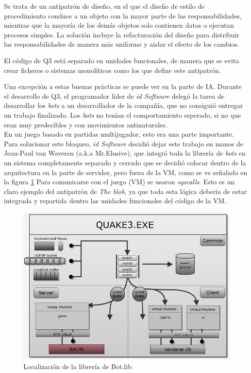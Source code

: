 \documentclass[a4paper,12pt]{report}
\begin{document}
Se trata de un antipatrón de diseño, en el que el diseño de estilo de procedimiento conduce a un objeto con la mayor parte de las responsabilidades, mientras que la mayoría de los demás objetos solo contienen datos o ejecutan procesos simples. La solución incluye la refacturación del diseño para distribuir las responsabilidades de manera más uniforme y aislar el efecto de los cambios.

El código de Q3 está separado en unidades funcionales, de manera que se evita crear ficheros o sistemas monolíticos como los que define este antipatrón.

Una excepción a estas buenas prácticas se puede ver en la parte de IA. Durante el desarrollo de Q3, el programador líder de \textit{id Software} delegó la tarea de desarrollar los \textit{bots} a un desarrollador de la compañía, que no consiguió entregar un trabajo finalizado. Los \textit{bots} no tenían el comportamiento esperado, si no que eran muy predecibles y con movimientos antinaturales. \\

En un juego basado en partidas multijugador, esto era una parte importante. Para solucionar este bloqueo, \textit{id Software} decidió dejar este trabajo en manos de Jean-Paul van Waveren (a.k.a Mr.Elusive), que integró toda la librería de \textit{bots} en un sistema completamente separado y cerrado que se decidió colocar dentro de la arquitectura en la parte de servidor, pero fuera de la VM, como se ve señalado en la figura \ref{fig:bot}
Para comunicarse con el juego (VM) se usaron \textit{syscalls}. Esto es un claro ejemplo del antipatrón de \textit{The blob}, ya que toda esta lógica debería de estar integrada y repartida dentro las unidades funcionales del código de la VM.

	\begin{center}
	\begin{figure}[h]
		\includegraphics[width=1\textwidth]{images/bot}
        \caption{Localización de la librería de Bot.lib}
		\label{fig:bot}
	\end{figure}
\end{center}
\end{document}
